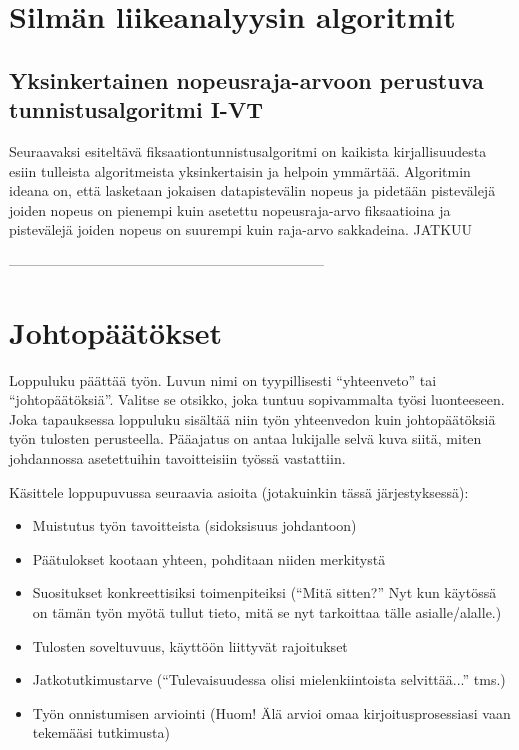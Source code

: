 \section{Silmän liikeanalyysin algoritmit}
\subsection{Yksinkertainen nopeusraja-arvoon perustuva tunnistusalgoritmi I-VT}
Seuraavaksi esiteltävä fiksaationtunnistusalgoritmi on kaikista kirjallisuudesta esiin tulleista algoritmeista yksinkertaisin ja helpoin ymmärtää. Algoritmin ideana on, että lasketaan jokaisen datapistevälin nopeus ja pidetään pistevälejä joiden nopeus on pienempi kuin asetettu nopeusraja-arvo fiksaatioina ja pistevälejä joiden nopeus on suurempi kuin raja-arvo sakkadeina. \citet[s. 73]{salvucci2000} JATKUU
\label{sec:esimluku}

 --------------------------------------------------------------------

\section{Johtopäätökset}

Loppuluku päättää työn. Luvun nimi on tyypillisesti ``yhteenveto'' tai
``johtopäätöksiä''. Valitse se otsikko, joka tuntuu sopivammalta työsi
luonteeseen. Joka tapauksessa loppuluku sisältää niin työn yhteenvedon
kuin johtopäätöksiä työn tulosten perusteella. Pääajatus on antaa
lukijalle selvä kuva siitä, miten johdannossa asetettuihin
tavoitteisiin työssä vastattiin.

Käsittele loppupuvussa seuraavia asioita (jotakuinkin tässä järjestyksessä):
%
\begin{itemize}
  \item Muistutus työn tavoitteista (sidoksisuus johdantoon)
  \item Päätulokset kootaan yhteen, pohditaan niiden merkitystä
  \item Suositukset konkreettisiksi toimenpiteiksi (``Mitä sitten?'' 
Nyt kun käytössä on tämän työn myötä tullut tieto, 
mitä se nyt tarkoittaa tälle asialle/alalle.)
  \item Tulosten soveltuvuus, käyttöön liittyvät rajoitukset
  \item Jatkotutkimustarve 
(``Tulevaisuudessa olisi mielenkiintoista selvittää...'' tms.)
  \item Työn onnistumisen arviointi 
(Huom! Älä arvioi omaa kirjoitusprosessiasi vaan tekemääsi tutkimusta)
\end{itemize}


